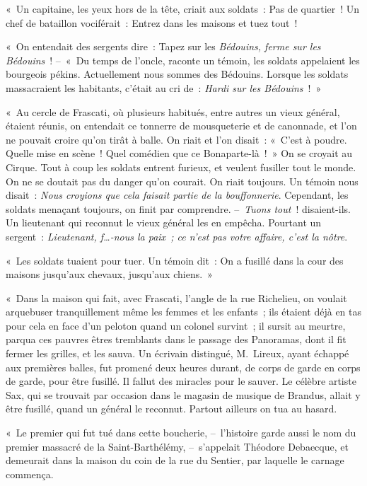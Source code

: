\documentclass[french,twoside]{book} %
\begin{document}
« Un capitaine, les yeux hors de la tête, criait aux soldats : Pas de quartier ! Un chef de bataillon vociférait : Entrez dans les maisons et tuez tout !\par
« On entendait des sergents dire : Tapez sur les \emph{Bédouins, ferme sur les Bédouins} ! – « Du temps de l’oncle, raconte un témoin, les soldats appelaient les bourgeois pékins. Actuellement nous sommes des Bédouins. Lorsque les soldats massacraient les habitants, c’était au cri de : \emph{Hardi sur les Bédouins} ! »\par
« Au cercle de Frascati, où plusieurs habitués, entre autres un vieux général, étaient réunis, on entendait ce tonnerre de mousqueterie et de canonnade, et l’on ne pouvait croire qu’on tirât à balle. On riait et l’on disait : « C’est à poudre. Quelle mise en scène ! Quel comédien que ce Bonaparte-là ! » On se croyait au Cirque. Tout à coup les soldats entrent furieux, et veulent fusiller tout le monde. On ne se doutait pas du danger qu’on courait. On riait toujours. Un témoin nous disait : \emph{Nous croyions que cela faisait partie de la bouffonnerie}. Cependant, les soldats menaçant toujours, on finit par comprendre. – \emph{Tuons tout} ! disaient-ils. Un lieutenant qui reconnut le vieux général les en empêcha. Pourtant un sergent : \emph{Lieutenant, f…-nous la paix ; ce n’est pas votre affaire, c’est la nôtre}.\par
« Les soldats tuaient pour tuer. Un témoin dit : On a fusillé dans la cour des maisons jusqu’aux chevaux, jusqu’aux chiens. »\par
« Dans la maison qui fait, avec Frascati, l’angle de la rue Richelieu, on voulait arquebuser tranquillement même les femmes et les enfants ; ils étaient déjà en tas pour cela en face d’un peloton quand un colonel survint ; il sursit au meurtre, parqua ces pauvres êtres tremblants dans le passage des Panoramas, dont il fit fermer les grilles, et les sauva. Un écrivain distingué, M. Lireux, ayant échappé aux premières balles, fut promené deux heures durant, de corps de garde en corps de garde, pour être fusillé. Il fallut des miracles pour le sauver. Le célèbre artiste Sax, qui se trouvait par occasion dans le magasin de musique de Brandus, allait y être fusillé, quand un général le reconnut. Partout ailleurs on tua au hasard.\par
« Le premier qui fut tué dans cette boucherie, – l’histoire garde aussi le nom du premier massacré de la Saint-Barthélémy, – s’appelait Théodore Debaecque, et demeurait dans la maison du coin de la rue du Sentier, par laquelle le carnage commença.
\end{document}
